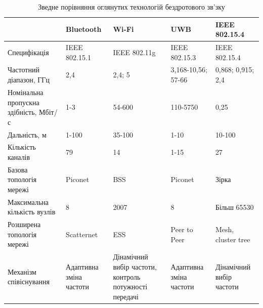 \documentclass[a4paper,ukrainian,utf8,nocolumnsxix,floatsection,equationsection]{eskdtext}
\begin{document}
\begin{table}[htbp]
\caption{Зведне порівняння оглянутих технологій бездротового зв’зку}
\begin{tabular}{|p{}|p{}|p{}|p{}|p{}|}
\hline
                                       & Bluetooth               & Wi-Fi                                                  & UWB                     & IEEE 802.15.4            \\ \hline
Специфікація                           & IEEE 802.15.1 	         & IEEE 802.11g                                           & IEEE 802.15.3           & IEEE 802.15.4            \\ \hline
Частотний діапазон, ГГц                & 2,4                     & 2,4; 5                                                 & 3,168-10,56; 57-66      & 0,868; 0,915; 2,4        \\ \hline
Номінальна пропускна здібність, Мбіт/с & 1-3                     & 54-600                                                 & 110-5750                & 0,25                     \\ \hline
Дальність, м                           & 1-100                   & 35-100                                                 & 1-10                    & 10-100                   \\ \hline
Кількість каналів                      & 79                      & 14                                                     & 1-15                    & 27                       \\ \hline
Базова топологія мережі                & Piconet                 & BSS                                                    & Piconet                 & Зірка                    \\ \hline
Максимальна кількість вузлів           & 8                       & 2007                                                   & 8                       & Більш 65530              \\ \hline
Розширена топологія мережі             & Scatternet              & ESS                                                    & Peer to Peer            & Mesh, cluster tree       \\ \hline
Механізм співіснування                 & Адаптивна зміна частоти & Дінамічний вибір частоти, контроль потужності передачі & Адаптивна зміна частоти & Дінамічний вибір частоти \\ \hline

\end{tabular}

\label{tbl:wireless_tech_comparison}

\end{table}
\end{document}
